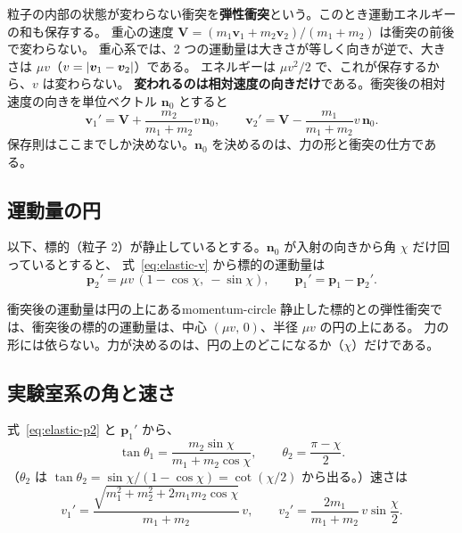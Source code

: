 粒子の内部の状態が変わらない衝突を\textbf{弾性衝突}という。このとき運動エネルギーの和も保存する。
重心の速度 $\bm V=(m_1\bm v_1+m_2\bm v_2)/(m_1+m_2)$ は衝突の前後で変わらない。
重心系では、2 つの運動量は大きさが等しく向きが逆で、大きさは $\mu v$（$v=\left\lvert \bm v_1-\bm v_2\right\rvert$）である。
エネルギーは $\mu v^2/2$ で、これが保存するから、$v$ は変わらない。
\textbf{変われるのは相対速度の向きだけ}である。衝突後の相対速度の向きを単位ベクトル $\bm n_0$ とすると
\begin{equation}
  \bm v_1'=\bm V+\frac{m_2}{m_1+m_2}v\,\bm n_0,\qquad
  \bm v_2'=\bm V-\frac{m_1}{m_1+m_2}v\,\bm n_0 .
  \label{eq:elastic-v}
\end{equation}
保存則はここまでしか決めない。$\bm n_0$ を決めるのは、力の形と衝突の仕方である。

\subsection{運動量の円}

以下、標的（粒子 2）が静止しているとする。$\bm n_0$ が入射の向きから角 $\chi$ だけ回っているとすると、
式~\eqref{eq:elastic-v} から標的の運動量は
\begin{equation}
  \bm p_2'=\mu v\,(1-\cos\chi,\ -\sin\chi),\qquad\bm p_1'=\bm p_1-\bm p_2' .
  \label{eq:elastic-p2}
\end{equation}

\begin{result}{衝突後の運動量は円の上にある}{momentum-circle}
静止した標的との弾性衝突では、衝突後の標的の運動量は、中心 $(\mu v,\,0)$、半径 $\mu v$ の円の上にある。
力の形には依らない。力が決めるのは、円の上のどこになるか（$\chi$）だけである。
\end{result}

\subsection{実験室系の角と速さ}

式~\eqref{eq:elastic-p2} と $\bm p_1'$ から、
\begin{equation}
  \tan\theta_1=\frac{m_2\sin\chi}{m_1+m_2\cos\chi},\qquad
  \theta_2=\frac{\pi-\chi}{2}.
  \label{eq:elastic-angles}
\end{equation}
（$\theta_2$ は $\tan\theta_2=\sin\chi/(1-\cos\chi)=\cot(\chi/2)$ から出る。）速さは
\begin{equation}
  v_1'=\frac{\sqrt{m_1^2+m_2^2+2m_1m_2\cos\chi}}{m_1+m_2}\,v,\qquad
  v_2'=\frac{2m_1}{m_1+m_2}\,v\sin\frac\chi2 .
  \label{eq:elastic-speeds}
\end{equation}

